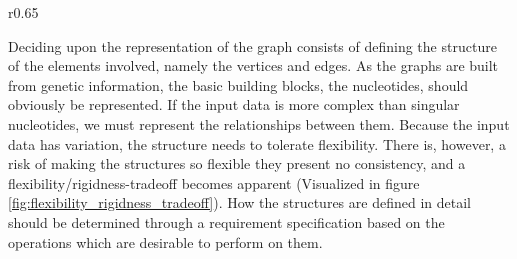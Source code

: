 \documentclass[thesis.tex]{subfiles}
\begin{document}
\begin{wrapfigure}{r}{0.65\textwidth}
\begin{mdframed}
\begin{subfigure}[t]{\textwidth}
\begin{mdframed}
\begin{center}
        \end{center}
      \end{mdframed}
      \captionsetup{skip=-8pt}
    \end{subfigure}
  \end{mdframed}
  \caption[Two proposed graph models]{Two proposed graph models displaying flexibility (a) and rigidity (b)}
  \label{fig:flexibility_rigidness_tradeoff}
\end{wrapfigure}
Deciding upon the representation of the graph consists of defining the structure of the elements involved, namely the vertices and edges. As the graphs are built from genetic information, the basic building blocks, the nucleotides, should obviously be represented. If the input data is more complex than singular nucleotides, we must represent the relationships between them. Because the input data has variation, the structure needs to tolerate flexibility. There is, however, a risk of making the structures so flexible they present no consistency, and a flexibility/rigidness-tradeoff becomes apparent (Visualized in figure \ref{fig:flexibility_rigidness_tradeoff}). How the structures are defined in detail should be determined through a requirement specification based on the operations which are desirable to perform on them.
\end{document}
